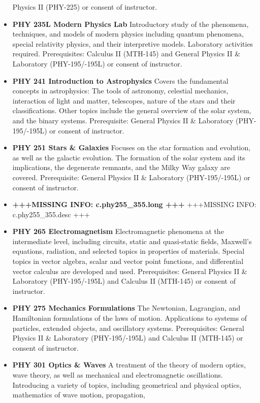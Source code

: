 \documentclass[
  letterpaper,
]{scrbook}
\begin{document}
\begin{itemize}
  Physics II (PHY-225) or consent of instructor.
\item
  \textbf{PHY 235L Modern Physics Lab} Introductory study of the
  phenomena, techniques, and models of modern physics including quantum
  phenomena, special relativity physics, and their interpretive models.
  Laboratory activities required. Prerequisites: Calculus II (MTH-145)
  and General Physics II \& Laboratory (PHY-195/-195L) or consent of
  instructor.
\item
  \textbf{PHY 241 Introduction to Astrophysics} Covers the fundamental
  concepts in astrophysics: The tools of astronomy, celestial mechanics,
  interaction of light and matter, telescopes, nature of the stars and
  their classifications. Other topics include the general overview of
  the solar system, and the binary systems. Prerequisite: General
  Physics II \& Laboratory (PHY-195/-195L) or consent of instructor.
\item
  \textbf{PHY 251 Stars \& Galaxies} Focuses on the star formation and
  evolution, as well as the galactic evolution. The formation of the
  solar system and its implications, the degenerate remnants, and the
  Milky Way galaxy are covered. Prerequisite: General Physics II \&
  Laboratory (PHY-195/-195L) or consent of instructor.
\item
  \textbf{+++MISSING INFO: c.phy255\_355.long +++} +++MISSING INFO:
  c.phy255\_355.desc +++
\item
  \textbf{PHY 265 Electromagnetism} Electromagnetic phenomena at the
  intermediate level, including circuits, static and quasi-static
  fields, Maxwell's equations, radiation, and selected topics in
  properties of materials. Special topics in vector algebra, scalar and
  vector point functions, and differential vector calculus are developed
  and used. Prerequisites: General Physics II \& Laboratory
  (PHY-195/-195L) and Calculus II (MTH-145) or consent of instructor.
\item
  \textbf{PHY 275 Mechanics Formulations} The Newtonian, Lagrangian, and
  Hamiltonian formulations of the laws of motion. Applications to
  systems of particles, extended objects, and oscillatory systems.
  Prerequisites: General Physics II \& Laboratory (PHY-195/-195L) and
  Calculus II (MTH-145) or consent of instructor.
\item
  \textbf{PHY 301 Optics \& Waves} A treatment of the theory of modern
  optics, wave theory, as well as mechanical and electromagnetic
  oscillations. Introducing a variety of topics, including geometrical
  and physical optics, mathematics of wave motion, propagation,

\end{itemize}
\end{document}
